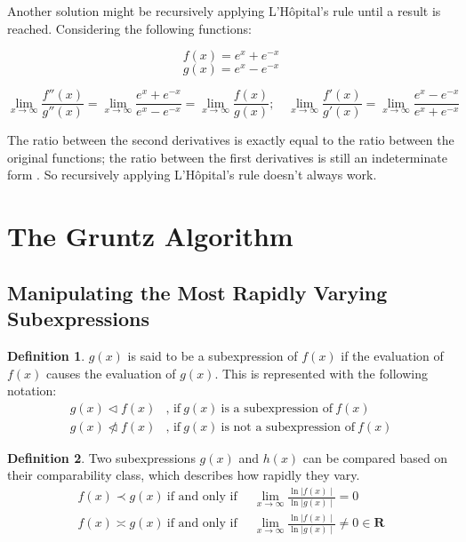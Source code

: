 \documentclass{article}
\theoremstyle{plain}
\theoremstyle{definition}
\newtheorem*{defn*}{Definition}
\theoremstyle{algorithm}
\begin{document}
	Another solution might be recursively applying L'Hôpital's rule \cite{wiki:hopital} until a result is reached.
	Considering the following functions:
	
	\[
	f(x) = e^{x} + e^{-x}
	\] 
	\[
	g(x) = e^{x} - e^{-x}
	\]
	
	\[
	\lim_{x \to \infty}{\frac{f''(x)}{g''(x)}} = \lim_{x \to \infty}{\frac{e^{x} + e^{-x}}{e^{x} - e^{-x}}} = \lim_{x \to \infty}{\frac{f(x)}{g(x)}}; \quad \lim_{x \to \infty}{\frac{f'(x)}{g'(x)}} = \lim_{x \to \infty}{\frac{e^{x} - e^{-x}}{e^{x} + e^{-x}}}
	\]
	
	The ratio between the second derivatives is exactly equal to the ratio between the original functions; the ratio between the first derivatives is still an indeterminate form \cite{wiki:ind}.
	So recursively applying L'Hôpital's rule doesn't always work.
	
	\section{The Gruntz Algorithm}
	
	\subsection{Manipulating the Most Rapidly Varying Subexpressions}
	
	\begin{defn*}
		\(g(x)\) is said to be a subexpression of \(f(x)\) if the evaluation of \(f(x)\) causes the evaluation of \(g(x)\). This is represented with the following notation:
		\[
		\begin{aligned}
			g(x) \triangleleft f(x)&\text{, if} \: g(x) \: \text{is a subexpression of} \: f(x) \\
			g(x) \ntriangleleft f(x)&\text{, if} \: g(x) \: \text{is not a subexpression of} \: f(x)
		\end{aligned}
		\]
	\end{defn*}
	
	\begin{defn*}
		Two subexpressions \(g(x)\) and \(h(x)\) can be compared based on their comparability class, which describes how rapidly they vary.
		\[
		\begin{aligned}
			f(x) \prec g(x) \: \text{if and only if} \enspace &\lim_{x \to \infty}{\frac{\ln{\mid f(x)\mid}}{\ln{\mid g(x)\mid}}} = 0 \\ 
			f(x) \asymp g(x) \: \text{if and only if} \enspace &\lim_{x \to \infty}{\frac{\ln{\mid f(x)\mid}}{\ln{\mid g(x)\mid}}} \neq 0 \in \mathbf{R}
		\end{aligned} \tag{2} \label{defn:comparability}
		\] 
	\end{defn*} 
	
\end{document}
